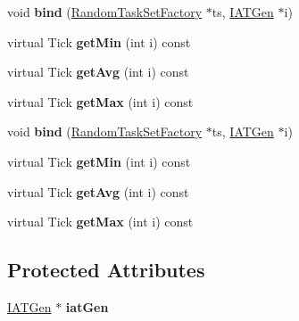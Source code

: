 \begin{DoxyCompactItemize}
\item 
void {\bfseries bind} (\hyperlink{classRTSim_1_1RandomTaskSetFactory}{Random\+Task\+Set\+Factory} $\ast$ts, \hyperlink{classRTSim_1_1IATGen}{I\+A\+T\+Gen} $\ast$i)\hypertarget{classRTSim_1_1OffsetGen_adabbfc7e50252169101a3806d06434df}{}\label{classRTSim_1_1OffsetGen_adabbfc7e50252169101a3806d06434df}

\item 
virtual Tick {\bfseries get\+Min} (int i) const \hypertarget{classRTSim_1_1OffsetGen_adfd806a9bd90dd813a56fc11f934fe9e}{}\label{classRTSim_1_1OffsetGen_adfd806a9bd90dd813a56fc11f934fe9e}

\item 
virtual Tick {\bfseries get\+Avg} (int i) const \hypertarget{classRTSim_1_1OffsetGen_a92130a08939f875a4ea72e770b4895e5}{}\label{classRTSim_1_1OffsetGen_a92130a08939f875a4ea72e770b4895e5}

\item 
virtual Tick {\bfseries get\+Max} (int i) const \hypertarget{classRTSim_1_1OffsetGen_a768b4d5751767f94c1d6aa330cc1d498}{}\label{classRTSim_1_1OffsetGen_a768b4d5751767f94c1d6aa330cc1d498}

\item 
void {\bfseries bind} (\hyperlink{classRTSim_1_1RandomTaskSetFactory}{Random\+Task\+Set\+Factory} $\ast$ts, \hyperlink{classRTSim_1_1IATGen}{I\+A\+T\+Gen} $\ast$i)\hypertarget{classRTSim_1_1OffsetGen_adabbfc7e50252169101a3806d06434df}{}\label{classRTSim_1_1OffsetGen_adabbfc7e50252169101a3806d06434df}

\item 
virtual Tick {\bfseries get\+Min} (int i) const \hypertarget{classRTSim_1_1OffsetGen_a18740590c8030d1ab7ba39ea6870b587}{}\label{classRTSim_1_1OffsetGen_a18740590c8030d1ab7ba39ea6870b587}

\item 
virtual Tick {\bfseries get\+Avg} (int i) const \hypertarget{classRTSim_1_1OffsetGen_aa9b61d5aec8fe16dcf6c195b14433853}{}\label{classRTSim_1_1OffsetGen_aa9b61d5aec8fe16dcf6c195b14433853}

\item 
virtual Tick {\bfseries get\+Max} (int i) const \hypertarget{classRTSim_1_1OffsetGen_a7cd035818b3c115473418161876b51cc}{}\label{classRTSim_1_1OffsetGen_a7cd035818b3c115473418161876b51cc}

\end{DoxyCompactItemize}
\subsection*{Protected Attributes}
\begin{DoxyCompactItemize}
\item 
\hyperlink{classRTSim_1_1IATGen}{I\+A\+T\+Gen} $\ast$ {\bfseries iat\+Gen}\hypertarget{classRTSim_1_1OffsetGen_ae6611754f28a68d68e168643f5cea1c8}{}\label{classRTSim_1_1OffsetGen_ae6611754f28a68d68e168643f5cea1c8}

\end{DoxyCompactItemize}


